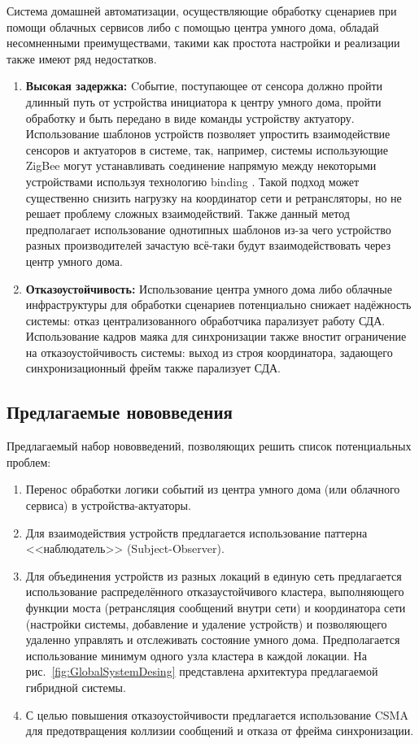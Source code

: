 \documentclass[a4paper,12pt]{article}
\begin{document}
Система домашней автоматизации, осуществляющие обработку сценариев при помощи облачных сервисов либо с помощью центра умного дома, обладай несомненными преимуществами, такими как
простота настройки и реализации также имеют ряд недостатков.
\begin{enumerate}
\item \textbf{Высокая задержка:} Cобытие, поступающее от сенсора должно пройти длинный путь от устройства инициатора к центру умного
дома, пройти обработку и быть передано в виде команды устройству актуатору. Использование шаблонов устройств позволяет упростить взаимодействие сенсоров и актуаторов в системе, так,
например, системы использующие ZigBee могут устанавливать соединение напрямую между некоторыми устройствами используя технологию binding \cite{ZIGBEE_SPEC_R23}. Такой подход может существенно
снизить нагрузку на координатор сети и ретрансляторы, но не решает проблему сложных взаимодействий. Также данный метод предполагает использование однотипных шаблонов из-за чего
устройство разных производителей зачастую всё-таки будут взаимодействовать через центр умного дома.
\item \textbf{Отказоустойчивость:} Использование центра умного дома либо облачные инфраструктуры для обработки сценариев потенциально снижает надёжность системы: отказ
централизованного обработчика парализует работу СДА. Использование кадров маяка для синхронизации также вностит ограничение на отказоустойчивость системы: выход из строя координатора,
задающего синхронизационный фрейм также парализует СДА.
\end{enumerate}

\subsection{Предлагаемые нововведения}

Предлагаемый набор нововведений, позволяющих решить список потенциальных проблем:
\begin{enumerate}
\item Перенос обработки логики событий из центра умного дома (или облачного сервиса) в устройства-актуаторы.
\item Для взаимодействия устройств предлагается использование паттерна <<наблюдатель>> (Subject-Observer).
\item Для объединения устройств из разных локаций в единую сеть предлагается использование распределённого отказаустойчивого кластера, выполняющего
функции моста (ретрансляция сообщений внутри сети) и координатора сети (настройки системы, добавление и удаление устройств) и позволяющего удаленно управлять и отслеживать состояние
умного дома. Предполагается использование минимум одного узла кластера в каждой локации. На рис.~\ref{fig:GlobalSystemDesing} представлена архитектура предлагаемой гибридной системы.
\item С целью повышения отказоустойчивости предлагается использование CSMA \cite{CSMA_article} для предотвращения коллизии сообщений и отказа от фрейма синхронизации.
\end{enumerate}
\end{document}
